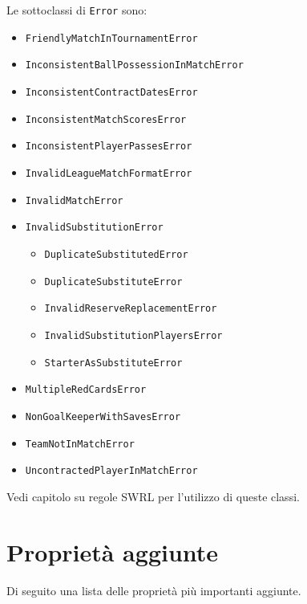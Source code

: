 \documentclass[11pt]{report} %
\begin{document}
Le sottoclassi di \texttt{Error} sono: 
\begin{itemize}
    \item \texttt{FriendlyMatchInTournamentError}
    \item \texttt{InconsistentBallPossessionInMatchError}
    \item \texttt{InconsistentContractDatesError}
    \item \texttt{InconsistentMatchScoresError}
    \item \texttt{InconsistentPlayerPassesError}
    \item \texttt{InvalidLeagueMatchFormatError}
    \item \texttt{InvalidMatchError}
    \item \texttt{InvalidSubstitutionError}
    \begin{itemize}
        \item \texttt{DuplicateSubstitutedError}
        \item \texttt{DuplicateSubstituteError}
        \item \texttt{InvalidReserveReplacementError}
        \item \texttt{InvalidSubstitutionPlayersError}
        \item \texttt{StarterAsSubstituteError}
    \end{itemize}
    \item \texttt{MultipleRedCardsError}
    \item \texttt{NonGoalKeeperWithSavesError}
    \item \texttt{TeamNotInMatchError}
    \item \texttt{UncontractedPlayerInMatchError}
\end{itemize}

Vedi capitolo su regole SWRL per l'utilizzo di queste classi.
\newpage

\section{Proprietà aggiunte}
Di seguito una lista delle proprietà più importanti aggiunte.
\end{document}
